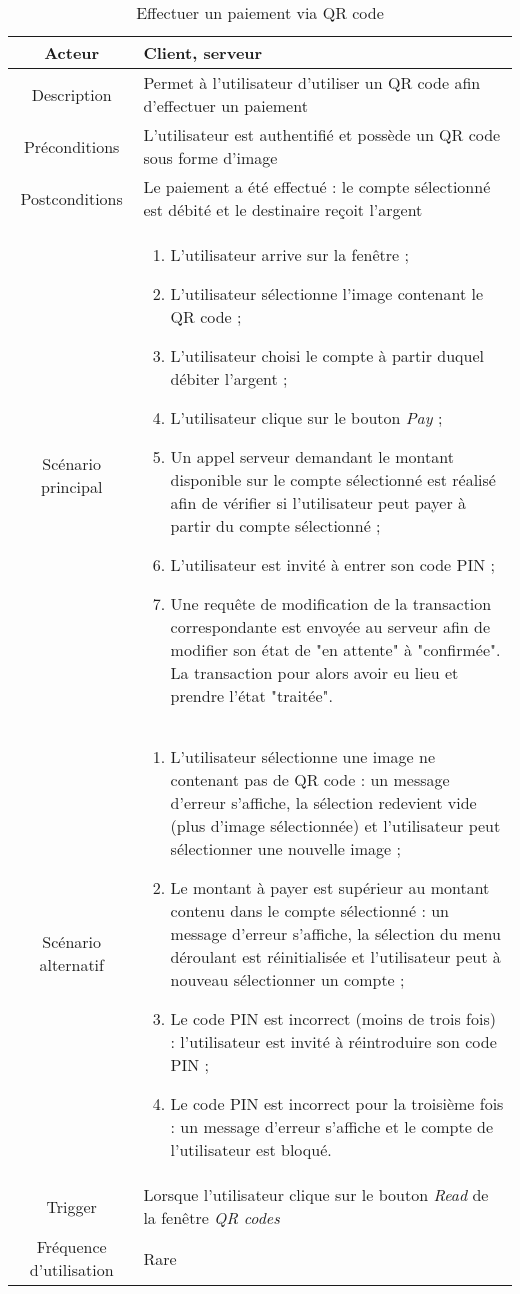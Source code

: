 \documentclass{article}
\begin{document}
\begin{table}

\begin{tabular}{|c|p{11cm}|}
\hline
Acteur & Client, serveur \\
\hline
Description & Permet à l'utilisateur d'utiliser un QR code afin d'effectuer un paiement \\
\hline
Préconditions & L'utilisateur est authentifié et possède un QR code sous forme d'image \\
\hline
Postconditions & Le paiement a été effectué : le compte sélectionné est débité et le destinaire reçoit l'argent \\
\hline
Scénario principal & \begin{enumerate}
\item L'utilisateur arrive sur la fenêtre ;
\item L'utilisateur sélectionne l'image contenant le QR code ;
\item L'utilisateur choisi le compte à partir duquel débiter l'argent ;
\item L'utilisateur clique sur le bouton \emph{Pay} ;
\item Un appel serveur demandant le montant disponible sur le compte sélectionné est réalisé afin de vérifier si l'utilisateur peut payer à partir du compte sélectionné ;
\item L'utilisateur est invité à entrer son code PIN ;
\item Une requête de modification de la transaction correspondante est envoyée au serveur afin de modifier son état de "en attente" à "confirmée". La transaction pour alors avoir eu lieu et prendre l'état "traitée".
\end{enumerate} \\
\hline
Scénario alternatif & \begin{enumerate}
\item L'utilisateur sélectionne une image ne contenant pas de QR code : un message d'erreur s'affiche, la sélection redevient vide (plus d'image sélectionnée) et l'utilisateur peut sélectionner une nouvelle image ;
\item Le montant à payer est supérieur au montant contenu dans le compte sélectionné : un message d'erreur s'affiche, la sélection du menu déroulant est réinitialisée et l'utilisateur peut à nouveau sélectionner un compte ;
\item Le code PIN est incorrect (moins de trois fois) : l'utilisateur est invité à réintroduire son code PIN ;
\item Le code PIN est incorrect pour la troisième fois : un message d'erreur s'affiche et le compte de l'utilisateur est bloqué.
\end{enumerate} \\
\hline
Trigger & Lorsque l'utilisateur clique sur le bouton \emph{Read} de la fenêtre \emph{QR codes} \\
\hline
Fréquence d'utilisation & Rare \\
\hline
\end{tabular}

\caption{Effectuer un paiement via QR code}

\end{table}
\end{document}
